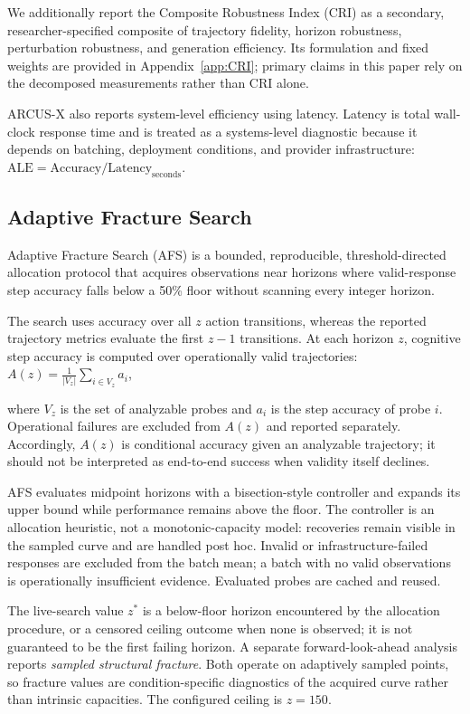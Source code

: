 \documentclass{article}
\begin{document}
We additionally report the Composite Robustness Index (CRI) as a secondary, researcher-specified composite of trajectory fidelity, horizon robustness, perturbation robustness, and generation efficiency. Its formulation and fixed weights are provided in Appendix~\ref{app:CRI}; primary claims in this paper rely on the decomposed measurements rather than CRI alone.

ARCUS-X also reports system-level efficiency using latency. Latency is total wall-clock response time and is treated as a systems-level diagnostic because it depends on batching, deployment conditions, and provider infrastructure: $\text{ALE} = \text{Accuracy}/\text{Latency}_{\mathrm{seconds}}$.
\subsection{Adaptive Fracture Search}

Adaptive Fracture Search (AFS) is a bounded, reproducible, threshold-directed allocation protocol that acquires observations near horizons where valid-response step accuracy falls below a 50\% floor without scanning every integer horizon.

The search uses accuracy over all $z$ action transitions, whereas the reported trajectory metrics evaluate the first $z-1$ transitions. At each horizon $z$, cognitive step accuracy is computed over operationally valid trajectories: $A(z)=\frac{1}{|V_z|}\sum_{i\in V_z} a_i$,

where $V_z$ is the set of analyzable probes and $a_i$ is the step accuracy of probe $i$. Operational failures are excluded from $A(z)$ and reported separately. Accordingly, $A(z)$ is conditional accuracy given an analyzable trajectory; it should not be interpreted as end-to-end success when validity itself declines.

AFS evaluates midpoint horizons with a bisection-style controller and expands its upper bound while performance remains above the floor. The controller is an allocation heuristic, not a monotonic-capacity model: recoveries remain visible in the sampled curve and are handled post hoc. Invalid or infrastructure-failed responses are excluded from the batch mean; a batch with no valid observations is operationally insufficient evidence. Evaluated probes are cached and reused.

The live-search value $z^{*}$ is a below-floor horizon encountered by the allocation procedure, or a censored ceiling outcome when none is observed; it is not guaranteed to be the first failing horizon. A separate forward-look-ahead analysis reports \emph{sampled structural fracture}. Both operate on adaptively sampled points, so fracture values are condition-specific diagnostics of the acquired curve rather than intrinsic capacities. The configured ceiling is $z=150$.
\end{document}
